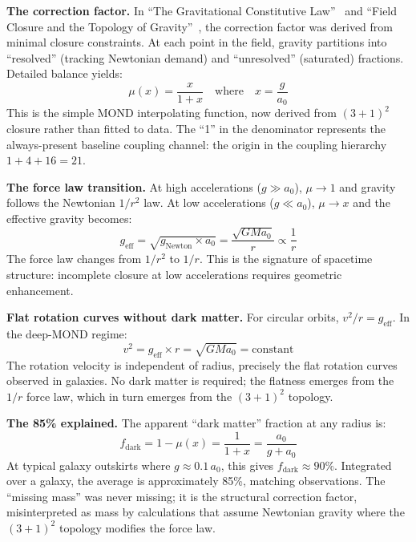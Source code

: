 \documentclass[aps,prd,preprint,superscriptaddress,showpacs,preprintnumbers,amsmath,amssymb,nofootinbib]{revtex4-2}
\begin{document}
\textbf{The correction factor.} In ``The Gravitational Constitutive Law''~\cite{paper1} and ``Field Closure and the Topology of Gravity''~\cite{paper5}, the correction factor was derived from minimal closure constraints. At each point in the field, gravity partitions into ``resolved'' (tracking Newtonian demand) and ``unresolved'' (saturated) fractions. Detailed balance yields:
\begin{equation}
\mu(x) = \frac{x}{1+x} \quad \text{where} \quad x = \frac{g}{a_0}
\label{eq:mu-dm}
\end{equation}
This is the simple MOND interpolating function, now derived from $(3+1)^2$ closure rather than fitted to data. The ``1'' in the denominator represents the always-present baseline coupling channel: the origin in the coupling hierarchy $1 + 4 + 16 = 21$.

\textbf{The force law transition.} At high accelerations ($g \gg a_0$), $\mu \to 1$ and gravity follows the Newtonian $1/r^2$ law. At low accelerations ($g \ll a_0$), $\mu \to x$ and the effective gravity becomes:
\begin{equation}
g_{\text{eff}} = \sqrt{g_{\text{Newton}} \times a_0} = \frac{\sqrt{G M a_0}}{r} \propto \frac{1}{r}
\label{eq:deep-mond}
\end{equation}
The force law changes from $1/r^2$ to $1/r$. This is the signature of spacetime structure: incomplete closure at low accelerations requires geometric enhancement.

\textbf{Flat rotation curves without dark matter.} For circular orbits, $v^2/r = g_{\text{eff}}$. In the deep-MOND regime:
\begin{equation}
v^2 = g_{\text{eff}} \times r = \sqrt{G M a_0} = \text{constant}
\label{eq:flat-rotation}
\end{equation}
The rotation velocity is independent of radius, precisely the flat rotation curves observed in galaxies. No dark matter is required; the flatness emerges from the $1/r$ force law, which in turn emerges from the $(3+1)^2$ topology.

\textbf{The 85\% explained.} The apparent ``dark matter'' fraction at any radius is:
\begin{equation}
f_{\text{dark}} = 1 - \mu(x) = \frac{1}{1 + x} = \frac{a_0}{g + a_0}
\label{eq:dark-fraction}
\end{equation}
At typical galaxy outskirts where $g \approx 0.1 \, a_0$, this gives $f_{\text{dark}} \approx 90\%$. Integrated over a galaxy, the average is approximately 85\%, matching observations. The ``missing mass'' was never missing; it is the structural correction factor, misinterpreted as mass by calculations that assume Newtonian gravity where the $(3+1)^2$ topology modifies the force law.
\end{document}

